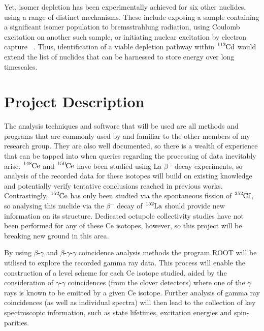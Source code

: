 \documentclass[12pt,a4paper]{article}
\begin{document}
\medskip
\noindent
Yet, isomer depletion has been experimentally achieved for six other nuclides, using a range of distinct mechanisms.
These include exposing a sample containing a significant isomer population to bremsstrahlung radiation, using Coulomb excitation on another such sample, or initiating nuclear excitation by electron capture
~\cite{shaffer_innovations_2018}.
Thus, identification of a viable depletion pathway within $\ce{^{113}Cd}$ would extend the list of nuclides that can be harnessed to store energy over long timescales.


\section*{Project Description}
The analysis techniques and software that will be used are all methods and programs that are commonly used by and familiar to the other members of my research group.
They are also well documented, so there is a wealth of experience that can be tapped into when queries regarding the processing of data inevitably arise.
$\ce{^{148}Ce}$ and $\ce{^{150}Ce}$ have been studied using La $\beta^-$ decay experiments, so analysis of the recorded data for these isotopes will build on existing knowledge and potentially verify tentative conclusions reached in previous works.
Contrastingly, $\ce{^{152}Ce}$ has only been studied via the spontaneous fission of $\ce{^{252}Cf}$, so analysing this nuclide via the $\beta^-$ decay of $\ce{^{152}La}$ should provide new information on its structure.
Dedicated octupole collectivity studies have not been performed for any of these Ce isotopes, however, so this project will be breaking new ground in this area.

\medskip
\noindent
By using $\beta$-$\gamma$ and $\beta$-$\gamma$-$\gamma$ coincidence analysis methods the program ROOT will be utilised to explore the recorded gamma ray data.
This process will enable the construction of a level scheme for each Ce isotope studied, aided by the consideration of $\gamma$-$\gamma$ coincidences (from the clover detectors) where one of the $\gamma$ rays is known to be emitted by a given Ce isotope.
Further analysis of gamma ray coincidences (as well as individual spectra) will then lead to the collection of key spectroscopic information, such as state lifetimes, excitation energies and spin-parities. %
\end{document}
